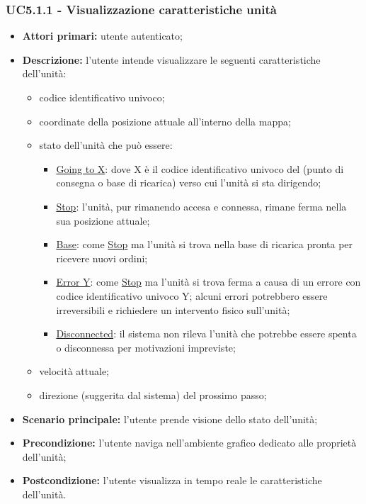         \subsubsection{UC5.1.1 - Visualizzazione caratteristiche unità}
        \begin{itemize}
            \item \textbf{Attori primari:} utente autenticato;
            \item \textbf{Descrizione:} l'utente intende visualizzare le seguenti caratteristiche dell'unità:
            \begin{itemize}
                \item codice identificativo univoco;
                \item coordinate della posizione attuale all'interno della mappa;
                \item stato dell'unità che può essere:
                \begin{itemize}
                    \item \underline{Going to X}: dove X è il codice identificativo univoco del  (punto di consegna o base di ricarica) verso cui l'unità si sta dirigendo;
                    \item \underline{Stop}: l'unità, pur rimanendo accesa e connessa, rimane ferma nella sua posizione attuale;
                    \item \underline{Base}: come \underline{Stop} ma l'unità si trova nella base di ricarica pronta per ricevere nuovi ordini;
                    \item \underline{Error Y}: come \underline{Stop} ma l'unità si trova ferma a causa di un errore con codice identificativo univoco Y; alcuni errori potrebbero essere irreversibili e richiedere un intervento fisico sull'unità;
                    \item \underline{Disconnected}: il sistema non rileva l'unità che potrebbe essere spenta o disconnessa per motivazioni impreviste;
                \end{itemize}
                \item velocità attuale;
                \item direzione (suggerita dal sistema) del prossimo passo;
            \end{itemize}
            \item \textbf{Scenario principale:} l'utente prende visione dello stato dell'unità;
            \item \textbf{Precondizione:} l'utente naviga nell'ambiente grafico dedicato alle proprietà dell'unità;
            \item \textbf{Postcondizione:} l'utente visualizza in tempo reale le caratteristiche dell'unità.
        \end{itemize}

